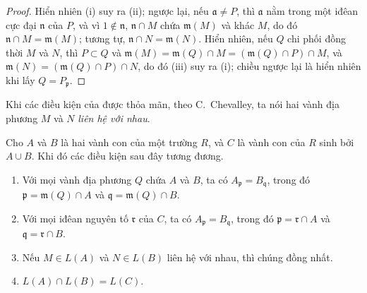 \documentclass[oneside]{amsart}
\let\EGAOriginalLabel\label
\renewcommand{\label}[1]{\phantomsection\EGAOriginalLabel{#1}}
\begin{document}
\begin{proof}
Hiển nhiên (i) suy ra (ii);
ngược lại, nếu $\mathfrak{a}\neq P$, thì $\mathfrak{a}$ nằm trong một iđêan cực đại $\mathfrak{n}$ của $P$, và vì $1\not\in\mathfrak{n}$, $\mathfrak{n}\cap M$ chứa $\mathfrak{m}(M)$ và khác $M$, do đó $\mathfrak{n}\cap M=\mathfrak{m}(M)$; tương tự, $\mathfrak{n}\cap N=\mathfrak{m}(N)$.
Hiển nhiên, nếu $Q$ chi phối đồng thời $M$ và $N$, thì $P\subset Q$ và $\mathfrak{m}(M)=\mathfrak{m}(Q)\cap M=(\mathfrak{m}(Q)\cap P)\cap M$, và $\mathfrak{m}(N)=(\mathfrak{m}(Q)\cap P)\cap N$, do đó (iii) suy ra (i);
chiều ngược lại là hiển nhiên khi lấy $Q=P_{\mathfrak{p}}$.
\end{proof}

Khi các điều kiện của  được thỏa mãn, theo C.~Chevalley, ta nói hai vành địa phương $M$ và $N$ \emph{liên hệ với nhau}.

\begin{proposition}[8.1.5]
\label{I.8.1.5}
Cho $A$ và $B$ là hai vành con của một trường $R$, và $C$ là vành con của $R$ sinh bởi $A\cup B$.
Khi đó các điều kiện sau đây tương đương.
\begin{enumerate}
  \item[{\rm(i)}] Với mọi vành địa phương $Q$ chứa $A$ và $B$, ta có $A_{\mathfrak{p}}=B_{\mathfrak{q}}$, trong đó $\mathfrak{p}=\mathfrak{m}(Q)\cap A$ và $\mathfrak{q}=\mathfrak{m}(Q)\cap B$.
  \item[{\rm(ii)}] Với mọi iđêan nguyên tố $\mathfrak{r}$ của $C$, ta có $A_{\mathfrak{p}}=B_{\mathfrak{q}}$, trong đó $\mathfrak{p}=\mathfrak{r}\cap A$ và $\mathfrak{q}=\mathfrak{r}\cap B$.
  \item[{\rm(iii)}] Nếu $M\in L(A)$ và $N\in L(B)$ liên hệ với nhau, thì chúng đồng nhất.
  \item[{\rm(iv)}] $L(A)\cap L(B)=L(C)$.
\end{enumerate}
\end{proposition}
\end{document}
